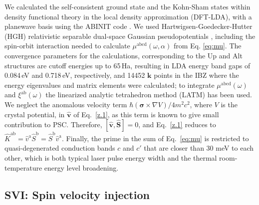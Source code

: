 \documentclass[floatfix,prb,aps,superscriptaddress,showpacs,11pt,preprint,letterpaper]{revtex4}
\begin{document}
We calculated the self-consistent ground state and the Kohn-Sham states within
density functional theory in the local density approximation (DFT-LDA), with a
planewave basis using the ABINIT code \cite{gonzeCPC09}. We used 
Hartwigsen-Goedecker-Hutter (HGH) relativistic separable dual-space Gaussian
pseudopotentials \cite{hartwigsenPRB98}, including the spin-orbit interaction
needed to calculate $\mu^{\mathrm{abcd}}(\omega,\alpha)$ from Eq.
\eqref{eq:mu}.
The convergence parameters for the calculations,  corresponding to the Up and
Alt structures are cutoff energies up to 65\,Ha, resulting in LDA
energy band gaps of 0.084\,eV and 0.718\,eV, respectively, 
and 14452 ${\mathbf k}$ points in the IBZ
where the energy
eigenvalues and matrix elements were calculated;
to
integrate $\mu^{\mathrm{abcd}}(\omega)$ and
$\xi^{\mathrm{a}\mathrm{b}}(\omega)$ the linearized analytic tetrahedron method
(LATM) has been used.\cite{nastosPRB07} 
We neglect the anomalous velocity term
$\hbar(\boldsymbol{\sigma}\times\nabla V)/4m^2c^2$, where $V$ is the crystal
potential, in $\hat{\mathbf v}$ of Eq.~\eqref{z.1}, as this term is known to
give small contribution to PSC.\cite{bhatPRL05} Therefore, $[\hat{\mathbf
v},\hat{\mathbf S}]=0$, and Eq.~\eqref{z.1} reduces to $\hat
K^{\mathrm{a}\mathrm{b}}=\hat v^\mathrm{a} \hat S^\mathrm{b}=\hat S^\mathrm{b}
\hat v^\mathrm{a}$. Finally, the prime in the sum of Eq.~\eqref{eq:mu} is
restricted to quasi-degenerated conduction bands $c$ and $c'$ that are closer
than 30 meV to each other, which  is both typical laser pulse energy width and the thermal
room-temperature energy level broadening.\cite{nastosPRB07}

\subsection{SVI: Spin velocity injection}
\label{sec:res-spin_velocity}
\end{document}
